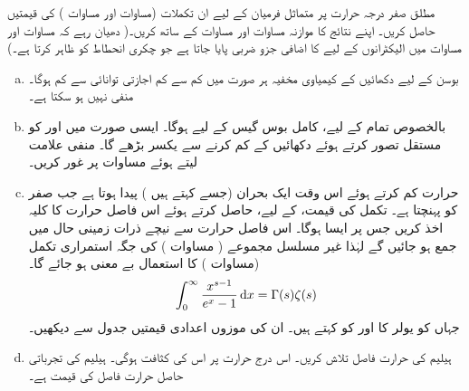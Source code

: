 مطلق صفر درجہ حرارت پر متماثل فرميان کے لیے ان تکملات (مساوات  اور مساوات  ) کی قیمتیں حاصل کریں۔ اپنے نتائج کا موازنہ مساوات  اور مساوات  کے ساتھ کریں۔( دھیان رہے کہ مساوات  اور مساوات  میں الیکٹرانوں کے لیے  کا اضافی جزو ضربی پایا جاتا ہے جو چکری انحطاط کو ظاہر کرتا ہے۔)
\begin{enumerate}[a.]
\item
بوسن کے لیے دکھائیں کے کیمیاوی مخفیہ ہر صورت میں کم سے کم اجازتی توانائی سے کم ہوگا۔   منفی نہیں ہو سکتا ہے۔ 
\item
بالخصوص تمام  کے لیے، کامل بوس گیس کے لیے  ہوگا۔ ایسی صورت میں  اور  کو مستقل تصور کرتے ہوئے دکھائیں کے  کم کرنے سے  یکسر بڑھے گا۔  منفی علامت لیتے ہوئے مساوات  پر غور کریں۔
\item
حرارت  کم کرتے ہوئے اس وقت ایک بحران (جسے  کہتے ہیں ) پیدا ہوتا ہے جب  صفر کو پہنچتا ہے۔ تکمل کی قیمت،  کے لیے، حاصل کرتے ہوئے اس فاصل حرارت کا کلیہ اخذ کریں جس پر ایسا ہوگا۔ اس فاصل حرارت سے نیچے ذرات زمینی حال میں جمع ہو جائیں گے لہٰذا غیر مسلسل مجموعے ( مساوات ) کی جگہ استمراری تکمل (مساوات ) کا استعمال بے معنی ہو جائے گا۔  
\begin{align}\label{مساوات_متماثل_گاما_زیٹا}
\int_0^{\infty} \frac{x^{s - 1}}{e^x - 1} \dif x = \Gamma (s) \zeta(s)
\end{align} 
جہاں  کو یولر کا  اور  کو  کہتے ہیں۔ ان کی موزوں اعدادی قیمتیں جدول سے دیکھیں۔ 
\item
ہیلیم  کی حرارت فاصل تلاش کریں۔ اس درج حرارت پر اس کی کثافت  ہوگی۔  ہیلیم کی تجرباتی حاصل حرارت فاصل کی قیمت  ہے۔ 
\end{enumerate}

